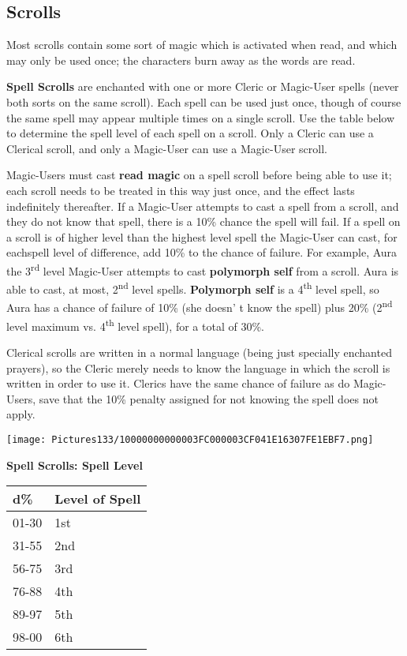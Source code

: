 \documentclass[a4paper,twoside,openany,10pt]{book}
\begin{document}
\begin{multicols}{2}
\subsection{Scrolls}\label{scrolls-1}

Most scrolls contain some sort of magic which is activated when read, and which may only be used once; the characters burn away as the words are read.

\textbf{Spell Scrolls} are enchanted with one or more Cleric or Magic-User spells (never both sorts on the same scroll). Each spell can be used just once, though of course the same spell may appear multiple times on a single scroll. Use the table below to determine the spell level of each spell on a scroll. Only a Cleric can use a Clerical scroll, and only a Magic-User can use a Magic-User scroll.

Magic-Users must cast \textbf{read magic} on a spell scroll before being able to use it; each scroll needs to be treated in this way just once, and the effect lasts indefinitely thereafter. If a Magic-User attempts to cast a spell from a scroll, and they do not know that spell, there is a 10\% chance the spell will fail. If a spell on a scroll is of higher level than the highest level spell the Magic-User can cast, for eachspell level of difference, add 10\% to the chance of failure. For example, Aura the 3\textsuperscript{rd} level Magic-User attempts to cast \textbf{polymorph self} from a scroll. Aura is able to cast, at most, 2\textsuperscript{nd} level spells. \textbf{Polymorph self} is a 4\textsuperscript{th} level spell, so Aura has a chance of failure of 10\% (she doesn' t know the spell) plus 20\% (2\textsuperscript{nd} level maximum vs. 4\textsuperscript{th} level spell), for a total of 30\%.

Clerical scrolls are written in a normal language (being just specially enchanted prayers), so the Cleric merely needs to know the language in which the scroll is written in order to use it. Clerics have the same chance of failure as do Magic-Users, save that the 10\% penalty assigned for not knowing the spell does not apply.

\begin{flushleft} \texttt{[image: Pictures133/10000000000003FC000003CF041E16307FE1EBF7.png]}  \end{flushleft}


\textbf{Spell Scrolls: Spell Level}

\begin{tabular*}{0.93\linewidth}{@{\extracolsep{\fill}}ll}
\textbf{d\%} & \textbf{Level of Spell} \\\toprule
01-30 & 1st \\\hline
31-55 & 2nd \\\hline
56-75 & 3rd \\\hline
76-88 & 4th \\\hline
89-97 & 5th \\\hline
98-00 & 6th \\\bottomrule
\end{tabular*}\medskip


\end{multicols}
\end{document}
